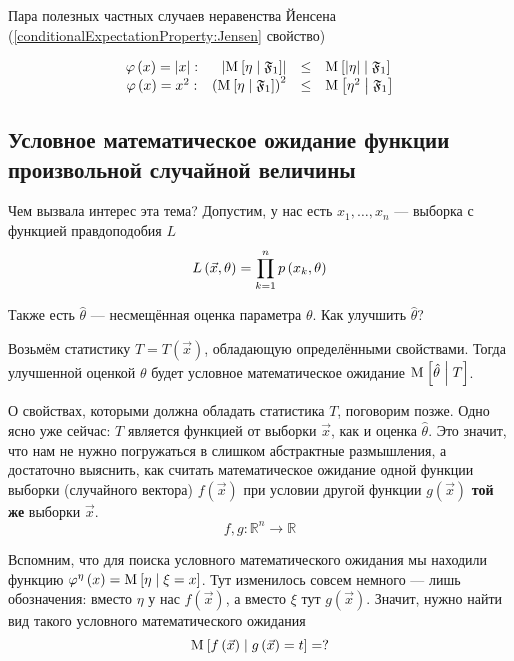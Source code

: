 Пара полезных частных случаев неравенства Йенсена
(\ref{conditionalExpectationProperty:Jensen} свойство)

$$\begin{array}{crcl}
    \varphi\left( x \right) = \left|x\right|:&
        \left| \mathrm{M}_{} \left[ \eta \;\middle|\; \mathfrak{F}_1 \right] \right|
            &\le& \mathrm{M}_{} \left[ \left| \eta \right| \;\middle|\; \mathfrak{F}_1 \right] \\
    \varphi\left( x \right) = x^2:&
        \left( \mathrm{M}_{} \left[ \eta \;\middle|\; \mathfrak{F}_1 \right] \right)^2
            &\le& \mathrm{M}_{} \left[ \eta^2 \;\middle|\; \mathfrak{F}_1 \right]
\end{array}$$

\subsection{Условное математическое ожидание функции
    произвольной случайной величины}\label{conditionalExpectationSubsection}

Чем вызвала интерес эта тема?
Допустим, у нас есть $x_1, \dots, x_n$ --- выборка с функцией правдоподобия $L$
$$L\left( \vec{x}, \theta \right) = \prod_{k=1}^n p\left(x_k, \theta\right)$$

Также есть $\hat{\theta}$ --- несмещённая оценка параметра $\theta$.
Как улучшить $\hat{\theta}$?

Возьмём статистику $T = T\left( \vec{x} \right)$,
обладающую определёнными свойствами.
Тогда улучшенной оценкой $\theta$ будет условное математическое ожидание
$\mathrm{M}_{} \left[  \hat{\theta} \;\middle|\; T  \right]$.

О свойствах, которыми должна обладать статистика $T$, поговорим позже.
Одно ясно уже сейчас: $T$ является функцией от выборки $\vec{x}$,
как и оценка $\hat{\theta}$.
Это значит, что нам не нужно погружаться в слишком абстрактные размышления,
а достаточно выяснить, как считать математическое ожидание
одной функции выборки (случайного вектора) $f\left( \vec{x} \right)$
при условии другой функции $g\left( \vec{x} \right)$
\textbf{той же} выборки $\vec{x}$.
$$f,g: \mathbb{R}^n \rightarrow \mathbb{R}$$

Вспомним, что для поиска условного математического ожидания
мы находили функцию
$\varphi^{\eta}\left( x \right) = \mathrm{M}_{} \left[  \eta \;\middle|\; \xi = x  \right]$.
Тут изменилось совсем немного --- лишь обозначения:
вместо $\eta$ у нас $f\left( \vec{x} \right)$,
а вместо $\xi$ тут $g\left( \vec{x} \right)$.
Значит, нужно найти вид такого условного математического ожидания
$$\mathrm{M}_{} \left[ f\left( \vec{x} \right) \;\middle|\; g\left( \vec{x} \right) = t \right] = ?$$


